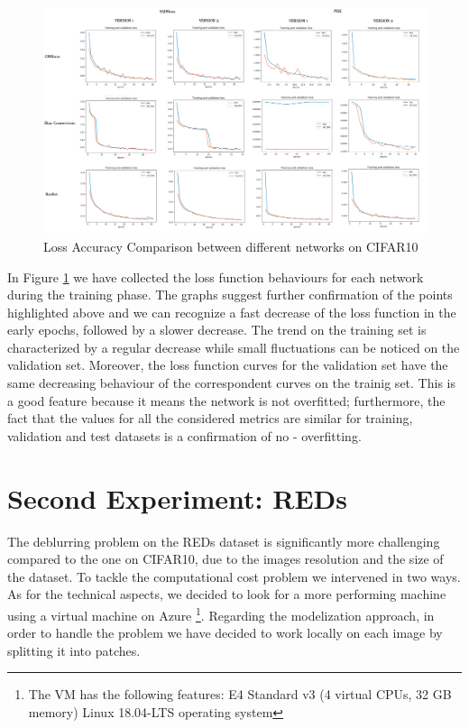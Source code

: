 \documentclass[12pt,a4paper]{report}
\begin{document}
\begin{figure}[hptb]
\includegraphics[scale=0.21]{Loss_accuracy_comparison.png}
\caption{Loss Accuracy Comparison between different networks on CIFAR10}
\label{CIFAR10Loss}
\end{figure}

In Figure \ref{CIFAR10Loss} we have collected the loss function behaviours for each network during the training phase. The graphs suggest further confirmation of the points highlighted above and we can recognize a fast decrease of the loss function in the early epochs, followed by a slower decrease. The trend on the training set is characterized by a regular decrease while small fluctuations can be noticed on the validation set. Moreover, the loss function curves for the validation set have the same decreasing behaviour of the correspondent curves on the trainig set. This is a good feature because it means the network is not overfitted; furthermore, the fact that the values for all the considered metrics are similar for training, validation and test datasets is a confirmation of no - overfitting.


\section{Second Experiment: REDs}
The deblurring problem on the REDs dataset is significantly more challenging compared to the one on CIFAR10, due to the images resolution and the size of the dataset. To tackle the computational cost problem we intervened in two ways. As for the technical aspects, we decided to look for a more performing machine using a virtual machine on Azure \footnote{The VM has the following features: E4 Standard v3 (4 virtual CPUs, 32 GB memory) Linux 18.04-LTS operating system}. Regarding the modelization approach, in order to handle the problem we have decided to work locally on each image by splitting it into patches.
\end{document}
